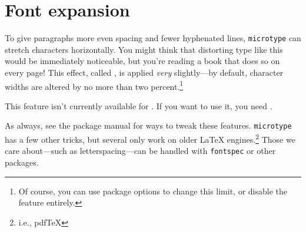 \section{Font expansion}

To give paragraphs more even spacing and fewer hyphenated lines,
\texttt{microtype} can stretch characters horizontally.
You might think that distorting type like this would be immediately
noticeable,
but you're reading a book that does so on every page!
This effect, called ,
is applied \emph{very} slightly---by default,
character widths are altered by no more than two percent.\punckern\footnote{%
Of course, you can use package options to change this limit,
or disable the feature entirely.}

This feature isn't currently available for \XeLaTeX{}.
If you want to use it, you need \LuaLaTeX{}.

\exercises{}

As always, see the package manual for ways to tweak these features.
\texttt{microtype} has a few other tricks,
but several only work on older \LaTeX{} engines.\punckern\footnote{i.e., pdf\TeX}
Those we care about---such as letterspacing---can be handled with
\texttt{fontspec} or other packages.
